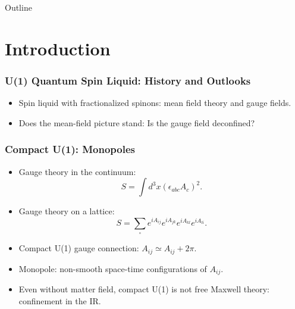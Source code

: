 \documentclass[xcolor=table, 10pt, aspectratio=169]{beamer}
\begin{document}
\begin{frame}{Outline}
		\tableofcontents
\end{frame}

\section{Introduction}

\begin{frame}
  \frametitle{U(1) Quantum Spin Liquid: History and Outlooks}
\begin{itemize}
  \item Spin liquid with fractionalized spinons: mean field theory and gauge fields.
  \item Does the mean-field picture stand: Is the gauge field deconfined?
\end{itemize}
\end{frame}

\begin{frame}
  \frametitle{Compact U(1): Monopoles}
  \begin{itemize}
    \item Gauge theory in the continuum:
    \[S=\int d^3x (\epsilon_{abc}A_c)^2.\]
    \item Gauge theory on a lattice:
    \[S=\sum_{\square}e^{iA_{ij}}e^{iA_{jk}}e^{iA_{kl}}e^{iA_{li}}.\]
    \item Compact U(1) gauge connection: $A_{ij}\simeq A_{ij}+2\pi$.
    \item Monopole: non-smooth space-time configurations of $A_{ij}$.
    \item Even without matter field, compact U(1) is not free Maxwell theory: confinement in the IR.
  \end{itemize}
\end{frame}
\end{document}
